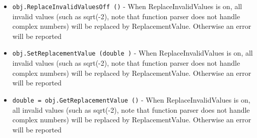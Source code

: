 \begin{itemize}
\item  \verb|obj.ReplaceInvalidValuesOff ()| -  When ReplaceInvalidValues is on, all invalid values (such as
 sqrt(-2), note that function parser does not handle complex
 numbers) will be replaced by ReplacementValue. Otherwise an
 error will be reported

\item  \verb|obj.SetReplacementValue (double )| -  When ReplaceInvalidValues is on, all invalid values (such as
 sqrt(-2), note that function parser does not handle complex
 numbers) will be replaced by ReplacementValue. Otherwise an
 error will be reported

\item  \verb|double = obj.GetReplacementValue ()| -  When ReplaceInvalidValues is on, all invalid values (such as
 sqrt(-2), note that function parser does not handle complex
 numbers) will be replaced by ReplacementValue. Otherwise an
 error will be reported

\end{itemize}
